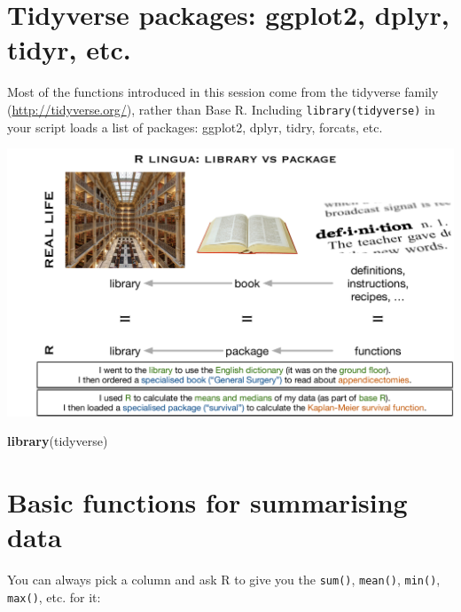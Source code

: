 \documentclass[12pt,]{krantz}
\makeatletter
\newenvironment{Shaded}{\begin{snugshade}}{\end{snugshade}}
\newcommand{\KeywordTok}[1]{\textcolor[rgb]{0.13,0.29,0.53}{\textbf{#1}}}
\newcommand{\NormalTok}[1]{#1}
\newcommand{\OperatorTok}[1]{\textcolor[rgb]{0.81,0.36,0.00}{\textbf{#1}}}
\newcommand{\StringTok}[1]{\textcolor[rgb]{0.31,0.60,0.02}{#1}}
\newenvironment{kframe}{%
\medskip{}
\setlength{\fboxsep}{.8em}
 \def\at@end@of@kframe{}%
 \ifinner\ifhmode%
  \def\at@end@of@kframe{\end{minipage}}%
  \begin{minipage}{\columnwidth}%
 \fi\fi%
 \def\FrameCommand##1{\hskip\@totalleftmargin \hskip-\fboxsep
 \colorbox{shadecolor}{##1}\hskip-\fboxsep
     \hskip-\linewidth \hskip-\@totalleftmargin \hskip\columnwidth}%
 \MakeFramed {\advance\hsize-\width
   \@totalleftmargin\z@ \linewidth\hsize
   \@setminipage}}%
 {\par\unskip\endMakeFramed%
 \at@end@of@kframe}
\renewenvironment{Shaded}{\begin{kframe}}{\end{kframe}}
\theoremstyle{definition}
\theoremstyle{definition}
\theoremstyle{definition}
\theoremstyle{remark}
\makeatother
\begin{document}
\hypertarget{tidyverse-packages-ggplot2-dplyr-tidyr-etc.}{%
\section{Tidyverse packages: ggplot2, dplyr, tidyr,
etc.}\label{tidyverse-packages-ggplot2-dplyr-tidyr-etc.}}

Most of the functions introduced in this session come from the tidyverse
family (\url{http://tidyverse.org/}), rather than Base R. Including
\texttt{library(tidyverse)} in your script loads a list of packages:
ggplot2, dplyr, tidry, forcats, etc.

\includegraphics[width=20.71in]{images/library_vs_package}

\begin{Shaded}
\begin{Highlighting}[]
\KeywordTok{library}\NormalTok{(tidyverse)}
\end{Highlighting}
\end{Shaded}

\hypertarget{basic-functions-for-summarising-data}{%
\section{Basic functions for summarising
data}\label{basic-functions-for-summarising-data}}

You can always pick a column and ask R to give you the \texttt{sum()},
\texttt{mean()}, \texttt{min()}, \texttt{max()}, etc. for it:

\begin{Shaded}
\end{Shaded}
\end{document}
